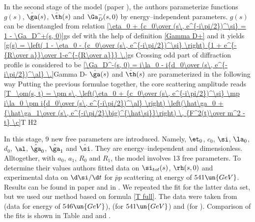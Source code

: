 In the second stage of the model (paper ), the authors parameterize functions $g(s)$, $\hat\ga(s)$, $\hat\th(s)$ and $\Ga^-_D(s, 0)$ by energy--independent parameters. $g(s)$ can be disentangled from relation
\eqref{\eta_0 + {c_0\over (s\, e^{-i\pi/2})^\si} = 1 - \Ga_D^+(s, 0)}{gs def}
with the help of definition \ref{Gamma D+} and it yields
\eqref{g(s) = \left( 1 - \eta_0 - {c_0\over (s\, e^{-i\pi/2})^\si} \right) {1 + e^{-{R\over a}}\over 1-e^{-{R\over a}}} \.}{gs}
Crossing odd part of diffraction profile is considered to be
\eqref{\Ga_D^-(s, 0) = i\la_0 - i{d_0\over (s\, e^{-i\pi/2})^\al} \.}{Gamma D-}
$\hat\ga(s)$ and $\hat\th(s)$ are parameterized in the following way
Putting the previous formulae together, the core scattering amplitude reads
\eqref{T_\om(s, t) = \pm s\, \left(\eta_0 + {c_0\over (s\, e^{-i\pi/2})^\si} \mp i\la_0 \pm i{d_0\over (s\, e^{-i\pi/2})^\al} \right) \left(\hat\ga_0 + {\hat\ga_1\over (s\, e^{-i\pi/2}\big)^{\hat\si}}\right) \, {F^2(t)\over m^2 - t} \c}{T H2}

In this stage, 9 new free parameters are introduced. Namely, $\et_0$, $c_0$, $\si$, $\la_0$, $d_0$, $\al$, $\hat\ga_0$, $\hat\ga_1$ and $\hat\si$. They are energy--independent and dimensionless. Alltogether, with $a_0$, $a_1$, $R_0$ and $R_1$, the model involves 13 free parameters. To determine their values authors fitted data on $\si_{tot}(s)$, $\rh(s, 0)$ and experimental data on $\d\si/\d t$ for $\bar pp$ scattering at energy of $541\un{GeV}$. Results can be found in paper  and in \fg{} . We repeated the fit for the latter data set, but we used our method based on formula \ref{T full}. The data were taken from  (data for energy of $546\un{GeV}$),  (for $541\un{GeV}$) and  (for ). Comparison of the fits is shown in Table  and \fgs{}  and .

